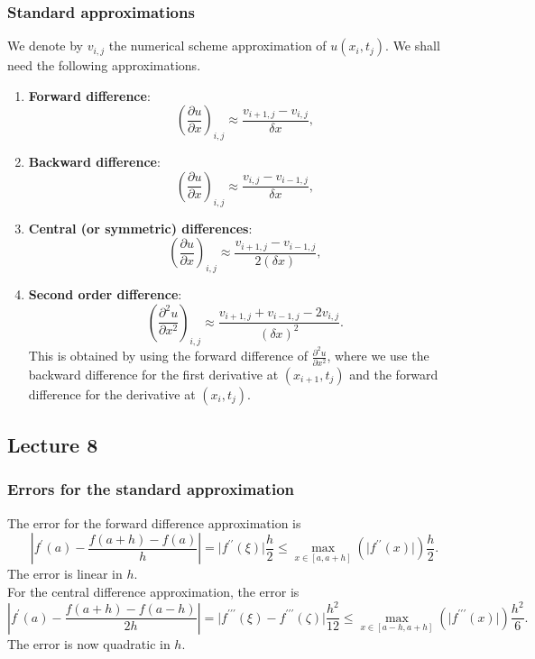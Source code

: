 \documentclass{article}
\begin{document}
\subsubsection{Standard approximations}
We denote by $v_{i,j}$ the numerical scheme approximation of $u(x_i,t_j)$. We shall need the following approximations.
\begin{enumerate}
    \item \textbf{Forward difference}:
    \begin{equation}
        \left(\frac{\partial u}{\partial x}\right)_{i,j} \approx \frac{v_{i+1,j}-v_{i,j}}{\delta x},
    \end{equation}
    \item \textbf{Backward difference}:
    \begin{equation}
        \left(\frac{\partial u}{\partial x}\right)_{i,j} \approx \frac{v_{i,j}-v_{i-1,j}}{\delta x},
    \end{equation}
    \item \textbf{Central (or symmetric) differences}:
    \begin{equation}
        \left(\frac{\partial u}{\partial x}\right)_{i,j} \approx \frac{v_{i+1,j}-v_{i-1,j}}{2(\delta x)},
    \end{equation}
    \item \textbf{Second order difference}:
    \begin{equation}
        \left(\frac{\partial^2 u}{\partial x^2}\right)_{i,j} \approx \frac{v_{i+1,j}+v_{i-1,j}-2v_{i,j}}{(\delta x)^2}.
    \end{equation}
    This is obtained by using the forward difference of $\frac{\partial^2 u}{\partial x^2}$, where we use the backward difference for the first derivative at $(x_{i+1},t_j)$ and the forward difference for the derivative at $(x_i,t_j)$.
\end{enumerate}


\subsection{Lecture 8}
\subsubsection{Errors for the standard approximation}
The error for the forward difference approximation is 
\begin{equation}
    \left\vert f^\prime (a)-\frac{f(a+h)-f(a)}{h} \right\vert = \vert f^{\prime\prime}(\xi)\vert \frac{h}{2}\leq \max_{x\in [a,a+h]}(\vert f^{\prime\prime}(x)\vert)\frac{h}{2}.
\end{equation}
The error is linear in $h$.\\
For the central difference approximation, the error is
\begin{equation}
    \left\vert f^\prime (a)-\frac{f(a+h)-f(a-h)}{2h} \right\vert = \vert f^{\prime\prime\prime}(\xi)-f^{\prime\prime\prime}(\zeta)\vert \frac{h^2}{12}\leq \max_{x\in [a-h,a+h]}(\vert f^{\prime\prime\prime}(x)\vert)\frac{h^2}{6}.
\end{equation}
The error is now quadratic in $h$.
\end{document}
